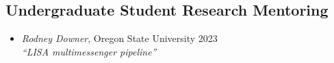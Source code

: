 \documentclass[11pt,letterpaper,sans,unicode]{moderncv}
\newcommand{\studentitem}[4]{\item \textit{#1}, {#2} \hfill{#3} \\ \textit{``#4''} } %
\newcommand{\blucirc}{{\color{color1} $\circ\;\;$}}
\begin{document}
\subsection{Undergraduate Student Research Mentoring}
\renewcommand\labelitemi{\blucirc}
\begin{itemize}[leftmargin=8mm]
	\studentitem{Rodney Downer}{Oregon State University}{2023}{LISA multimessenger pipeline}

\end{itemize}

\end{document}

